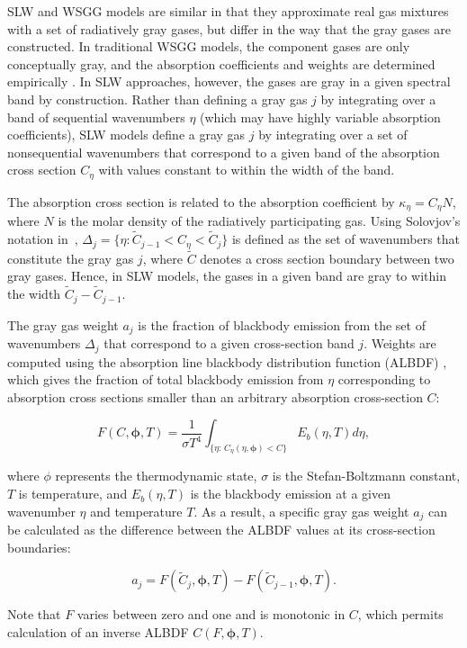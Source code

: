 \documentclass[preprint,12pt]{elsarticle}
\newcommand{\BS}{\boldsymbol}
\newcounter{bla}
\begin{document}
    SLW and WSGG models are similar in that they approximate real gas mixtures with a set of radiatively gray gases,
    but differ in the way that the gray gases are constructed. In traditional WSGG models, the component gases are only
    conceptually gray, and the absorption coefficients and weights are determined empirically \citep{Badger_2019}. In SLW approaches, however, the gases are gray in a given spectral band by construction. Rather than defining a gray gas $j$ by integrating over a band of sequential wavenumbers $\eta$ (which may have highly variable absorption coefficients), SLW models define a gray gas $j$ by integrating over a set of nonsequential wavenumbers that correspond to a given band of the absorption cross section $C_{\eta}$ with values constant to within the width of the band.

    The absorption cross section is related to the absorption coefficient by $\kappa_\eta=C_\eta N$, where $N$ is the molar density of the radiatively participating gas.
%
    Using Solovjov's notation in~\cite{Solovjov_2017}, $\Delta_j=\{\eta:\tilde{C}_{j-1}<C_\eta<\tilde{C}_j\}$ is defined as the set of wavenumbers that constitute the gray gas $j$, where $\tilde{C}$ denotes a cross section boundary between two gray gases. Hence, in SLW models, the gases in a given band are gray to within the width $\tilde{C}_j-\tilde{C}_{j-1}$.

    The gray gas weight $a_j$ is the fraction of blackbody emission from the set of wavenumbers $\Delta_j$ that correspond to a given cross-section band $j$. Weights are computed using the absorption line blackbody distribution function (ALBDF) \cite{Pearson_2014}, which gives the fraction of total blackbody emission from $\eta$ corresponding to absorption cross sections smaller than an arbitrary absorption cross-section $C$:
%
    \begin{linenomath}
        \begin{equation}
            \label{e:albdf}
            F(C,\BS{\phi},T) = \frac{1}{\sigma T^4}\int_{\{\eta:\,C_\eta(\eta,\BS{\phi})<C\}}E_b(\eta,T)d\eta,
        \end{equation}
    \end{linenomath}
%
    where $\phi$ represents the thermodynamic state, $\sigma$ is the Stefan-Boltzmann constant, $T$ is temperature, and $E_b(\eta,T)$ is the blackbody emission at a given wavenumber $\eta$ and temperature $T$.
    As a result, a specific gray gas weight $a_j$ can be calculated as the difference between the ALBDF values at its cross-section boundaries:
%
    \begin{linenomath}
        \begin{equation}
            \label{e:aj}
            a_j = F(\tilde{C}_j,\BS{\phi}, T) - F(\tilde{C}_{j-1}, \BS{\phi},T).
        \end{equation}
    \end{linenomath}
%
    Note that $F$ varies between zero and one and is monotonic in $C$, which permits calculation of an inverse ALBDF $C(F,\BS{\phi},T)$.
\end{document}

